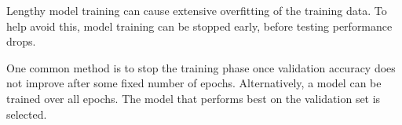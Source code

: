 Lengthy model training can cause extensive overfitting of the training data. To help avoid this, model training can be stopped early, before testing performance drops.

One common method is to stop the training phase once validation accuracy does not improve after some fixed number of epochs. Alternatively, a model can be trained over all epochs. The model that performs best on the validation set is selected.








